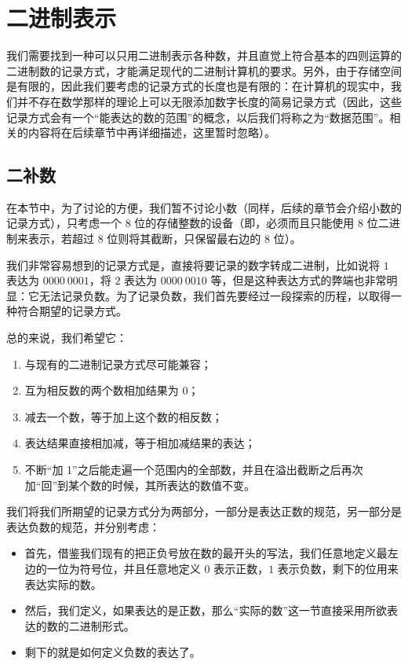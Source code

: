 \section{二进制表示}\label{sec:NumberSystemBasics/BinaryPresentation}
    我们需要找到一种可以只用二进制表示各种数，并且直觉上符合基本的四则运算的二进制数的记录方式，才能满足现代的二进制计算机的要求。另外，由于存储空间是有限的，因此我们要考虑的记录方式的长度也是有限的：在计算机的现实中，我们并不存在数学那样的理论上可以无限添加数字长度的简易记录方式（因此，这些记录方式会有一个“能表达的数的范围”的概念，以后我们将称之为“数据范围”。相关的内容将在后续章节中再详细描述，这里暂时忽略）。

    \subsection{二补数}\label{subsec:NumberSystemBasics/BinaryPresentation/TwosComplement}
        在本节中，为了讨论的方便，我们暂不讨论小数（同样，后续的章节会介绍小数的记录方式），只考虑一个 $8$ 位的存储整数的设备（即，必须而且只能使用 $8$ 位二进制来表示，若超过 $8$ 位则将其截断，只保留最右边的 $8$ 位）。

        我们非常容易想到的记录方式是，直接将要记录的数字转成二进制，比如说将 $1$ 表达为 $0000\ 0001$，将 $2$ 表达为 $0000\ 0010$ 等，但是这种表达方式的弊端也非常明显：它无法记录负数。为了记录负数，我们首先要经过一段探索的历程，以取得一种符合期望的记录方式。

        总的来说，我们希望它：
        \begin{enumerate}
            \item 与现有的二进制记录方式尽可能兼容；
            \item 互为相反数的两个数相加结果为 $0$；
            \item 减去一个数，等于加上这个数的相反数；
            \item 表达结果直接相加减，等于相加减结果的表达；
            \item 不断“加 1”之后能走遍一个范围内的全部数，并且在溢出截断之后再次加“回”到某个数的时候，其所表达的数值不变。
        \end{enumerate}

        我们将我们所期望的记录方式分为两部分，一部分是表达正数的规范，另一部分是表达负数的规范，并分别考虑：
        \begin{itemize}
            \item 首先，借鉴我们现有的把正负号放在数的最开头的写法，我们任意地定义最左边的一位为符号位，并且任意地定义 $0$ 表示正数，$1$ 表示负数，剩下的位用来表达实际的数。
            \item 然后，我们定义，如果表达的是正数，那么“实际的数”这一节直接采用所欲表达的数的二进制形式。
            \item 剩下的就是如何定义负数的表达了。
        \end{itemize}

